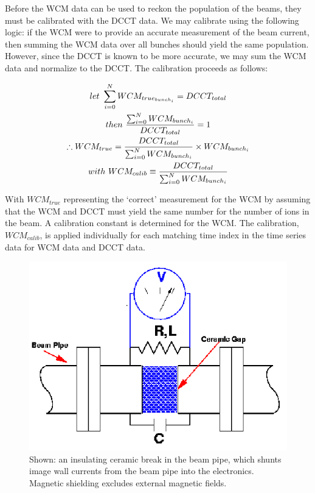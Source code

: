 Before the WCM data can be used to reckon the population of the beams, they must
be calibrated with the DCCT data. We may calibrate using the following logic: if
the WCM were to provide an accurate measurement of the beam current, then
summing the WCM data over all bunches should yield the same population. However,
since the DCCT is known to be more accurate, we may sum the WCM data and
normalize to the DCCT. The calibration proceeds as follows:

\begin{gather}
  let~\sum_{i=0}^{N} WCM_{true_{bunch_i}} = DCCT_{total} \\
  then~{{\sum_{i=0}^{N} WCM_{bunch_i}}\over{DCCT_{total}}} = 1 \\
  \therefore WCM_{true} =
  {{DCCT_{total}}\over{\sum_{i=0}^{N}WCM_{bunch_i}}}\times WCM_{bunch_i} \\
  with~WCM_{calib} \equiv {{DCCT_{total}}\over{\sum_{i=0}^{N}WCM_{bunch_i}}}
\end{gather}

{\noindent}With $WCM_{true}$ representing the `correct' measurement for the WCM
by assuming that the WCM and DCCT must yield the same number for the number of
ions in the beam. A calibration constant is determined for the WCM. The
calibration, $WCM_{calib}$, is applied individually for each matching time index
in the time series data for WCM data and DCCT data.

\begin{figure}[ht]
  \begin{center}
    \includegraphics[width=0.75\linewidth]{./figures/wcm_schematic_cartoon}
    \caption{ 
      Shown: an insulating ceramic break in the beam pipe, which shunts
      image wall currents from the beam pipe into the electronics. Magnetic
      shielding excludes external magnetic fields.~\cite{KawallFocus2004} 
    }
    \label{fig:wcm_schematic_cartoon}
  \end{center}
\end{figure}

